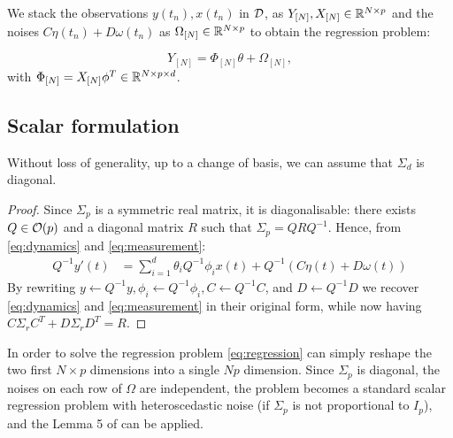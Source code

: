 \documentclass{article}
\begin{document}
We stack the observations $y(t_n), x(t_n)$ in $\mathcal{D}$, as $Y_{[N]}, X_{[N]}\in\mathbb{R}^{N\times p}$ and the noises $C\eta(t_n)+D\omega(t_n)$ as $\Omega_{[N]} \in\mathbb{R}^{N\times p}$ to obtain the regression problem:

\begin{equation}
    \label{eq:regression}
    Y_{[N]} = \Phi_{[N]} \theta + \Omega_{[N]},
\end{equation}
with $\Phi_{[N]} = X_{[N]}\phi^T\in \mathbb{R}^{N\times p\times d}$.



\subsection{Scalar formulation}

\begin{proposition}
Without loss of generality, up to a change of basis, we can assume that $\Sigma_d$ is diagonal.
\end{proposition}
\begin{proof}
Since $\Sigma_p$ is a symmetric real matrix, it is diagonalisable: there exists $Q\in\mathcal{O}(p)$ and a diagonal matrix $R$ such that $\Sigma_p = QRQ^{-1}$. Hence, from \eqref{eq:dynamics} and \eqref{eq:measurement}:
\begin{align*}
    Q^{-1}y'(t) &= \sum_{i=1}^d \theta_i Q^{-1}\phi_i x(t) + Q^{-1}(C\eta(t) + D\omega(t))
\end{align*}
By rewriting $y \leftarrow Q^{-1}y, \phi_i\leftarrow Q^{-1}\phi_i, C\leftarrow Q^{-1}C$, and $D\leftarrow Q^{-1}D$ we recover \eqref{eq:dynamics} and \eqref{eq:measurement} in their original form, while now having $C\Sigma_rC^T + D\Sigma_rD^T = R$.
\end{proof}

In order to solve the regression problem \eqref{eq:regression} can simply reshape the two first $N\times p$ dimensions into a single $Np$ dimension. Since $\Sigma_p$ is diagonal, the noises on each row of $\Omega$ are independent, the problem becomes a standard scalar regression problem with heteroscedastic noise (if $\Sigma_p$ is not proportional to $I_p$), and the Lemma 5 of \citet{kirschner18heteroscedastic} can be applied.
\end{document}
